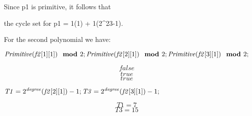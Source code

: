 \documentclass{article}
\begin{document}
\begin{Maple Normal}
Since p1 is primitive, it follows that\

the cycle set for p1 = 1(1) + 1(2^23-1).
\end{Maple Normal}
\begin{Maple Normal}

\end{Maple Normal}
\begin{Maple Normal}

\end{Maple Normal}
\begin{Maple Normal}

\end{Maple Normal}
\begin{Maple Normal}
For the second polynomial we have:
\end{Maple Normal}
\begin{Maple Normal}
{$ \displaystyle \mathit{Primitive} (\mathit{f2} [1][1])\boldsymbol{\mod}2;
\\
 \mathit{Primitive} (\mathit{f2} [2][1])\boldsymbol{\mod}2;
\\
 \mathit{Primitive} (\mathit{f2} [3][1])\boldsymbol{\mod}2; $}
\end{Maple Normal}
\begin{dmath*}
\mathit{false} 
\end{dmath*}
\vspace{-\bigskipamount}
\begin{dmath*}
\mathit{true} 
\end{dmath*}
\vspace{-\bigskipamount}
\begin{dmath}\label{(5)}
\mathit{true} 
\end{dmath}
\begin{Maple Normal}
{$ \displaystyle \mathit{T1} =2^{\mathit{degree} }(\mathit{f2} [2][1])-1;
\\
 \mathit{T3} =2^{\mathit{degree} }(\mathit{f2} [3][1])-1; $}
\end{Maple Normal}
\begin{dmath*}
\mathit{T1} =7
\end{dmath*}
\vspace{-\bigskipamount}
\begin{dmath}\label{(6)}
\mathit{T3} =15
\end{dmath}
\end{document}
